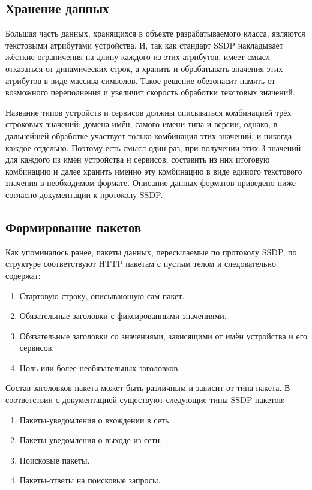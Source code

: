 \subsection{Хранение данных}
Большая часть данных, хранящихся в объекте разрабатываемого класса, являются текстовыми атрибутами устройства.
И, так как стандарт SSDP накладывает жёсткие ограничения на длину каждого из этих атрибутов, имеет смысл отказаться от динамических строк, а хранить и обрабатывать значения этих атрибутов в виде массива символов.
Такое решение обезопасит память от возможного переполнения и увеличит скорость обработки текстовых значений.

Название типов устройств и сервисов должны описываться комбинацией трёх строковых значений: домена имён, самого имени типа и версии, однако, в дальнейшей обработке участвует только комбинация этих значений, и никогда каждое отдельно.
Поэтому есть смысл один раз, при получении этих 3 значений для каждого из имён устройства и сервисов, составить из них итоговую комбинацию и далее хранить именно эту комбинацию в виде единого текстового значения в необходимом формате.
Описание данных форматов приведено ниже согласно документации к протоколу SSDP.

\subsection{Формирование пакетов} \label{subsection:ssdp-package}

Как упоминалось ранее, пакеты данных, пересылаемые по протоколу SSDP, по структуре соответствуют HTTP пакетам с пустым телом и следовательно содержат:
\begin{enumerate}
	\item Стартовую строку, описывающую сам пакет.
	\item Обязательные заголовки с фиксированными значениями.
	\item Обязательные заголовки со значениями, зависящими от имён устройства и его сервисов.
	\item Ноль или более необязательных заголовков.
\end{enumerate}

Состав заголовков пакета может быть различным и зависит от типа пакета.
В соответствии с документацией существуют следующие типы SSDP-пакетов:
\begin{enumerate}
	\item Пакеты-уведомления о вхождении в сеть.
	\item Пакеты-уведомления о выходе из сети.
	\item Поисковые пакеты.
	\item Пакеты-ответы на поисковые запросы.
\end{enumerate}

